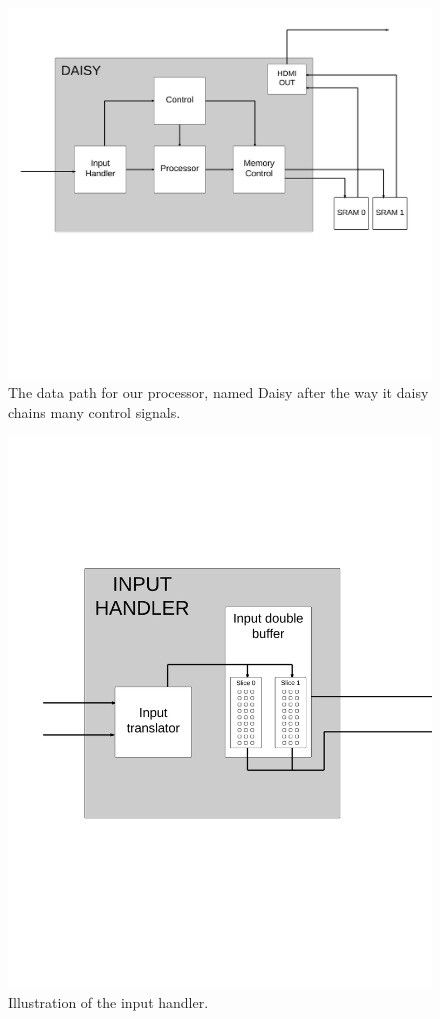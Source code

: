 \begin{figure}[h!]
    \includegraphics[width=\linewidth]{img/daisy_overview.png}
    \caption{The data path for our processor, named Daisy after the way it daisy chains many control signals.}
    \label{fig:Convolution}
\end{figure}

\begin{figure}[h!]
    \includegraphics[width=\linewidth]{img/input_handler.png}
    \caption{Illustration of the input handler.}
    \label{fig:Convolution}
\end{figure}

